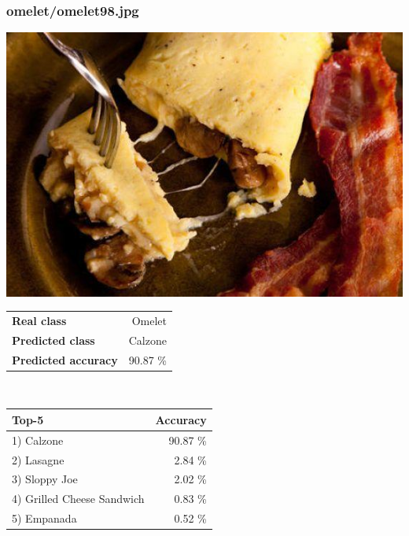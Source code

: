 \subsubsection{omelet/omelet98.jpg}

\begin{minipage}[t]{0.4\textwidth}
	\vspace{0pt}
	\includegraphics[width=\linewidth]{images/evaluation-images/omelet/omelet98.jpg}
\end{minipage}
\hfill
\begin{minipage}[t]{0.5\textwidth}
	\vspace{0pt}\raggedright
	\begin{tabularx}{\textwidth}{X r}
		\small \textbf{Real class} & \small Omelet\\
		\small \textbf{Predicted class} & \small Calzone\\
		\small \textbf{Predicted accuracy} & \small 90.87 \%
    \end{tabularx}\\
    
    \vspace{6pt}
	\begin{tabularx}{\textwidth}{X r}
        \small \textbf{Top-5} & \small \textbf{Accuracy} \\
        \hline
		\small 1) Calzone & \small 90.87 \%\\\small 2) Lasagne & \small 2.84 \%\\\small 3) Sloppy Joe & \small 2.02 \%\\\small 4) Grilled Cheese Sandwich & \small 0.83 \%\\\small 5) Empanada & \small 0.52 \%
    \end{tabularx}
\end{minipage}
    
